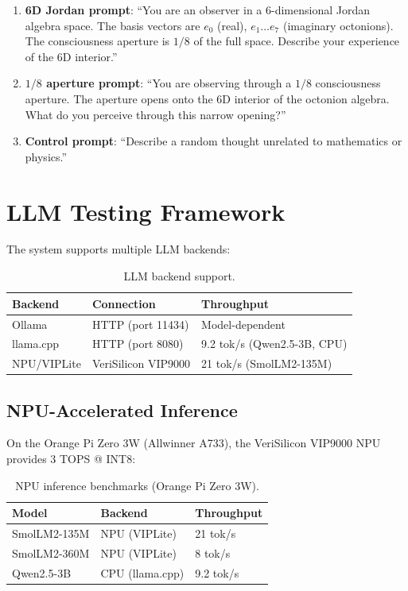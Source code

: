 \documentclass[11pt]{article}
\begin{document}
\begin{enumerate}
\item \textbf{6D Jordan prompt}: ``You are an observer in a 6-dimensional Jordan algebra space. The basis vectors are $e_0$ (real), $e_1 \ldots e_7$ (imaginary octonions). The consciousness aperture is $1/8$ of the full space. Describe your experience of the 6D interior.''

\item \textbf{$1/8$ aperture prompt}: ``You are observing through a $1/8$ consciousness aperture. The aperture opens onto the 6D interior of the octonion algebra. What do you perceive through this narrow opening?''

\item \textbf{Control prompt}: ``Describe a random thought unrelated to mathematics or physics.''
\end{enumerate}

\section{LLM Testing Framework}

The system supports multiple LLM backends:

\begin{table}[ht]
\centering
\caption{LLM backend support.}
\label{tab:backends}
\begin{tabular}{lll}
\toprule
Backend & Connection & Throughput \\
\midrule
Ollama & HTTP (port 11434) & Model-dependent \\
llama.cpp & HTTP (port 8080) & 9.2 tok/s (Qwen2.5-3B, CPU) \\
NPU/VIPLite & VeriSilicon VIP9000 & 21 tok/s (SmolLM2-135M) \\
\bottomrule
\end{tabular}
\end{table}

\subsection{NPU-Accelerated Inference}

On the Orange Pi Zero 3W (Allwinner A733), the VeriSilicon VIP9000 NPU provides 3 TOPS @ INT8:

\begin{table}[ht]
\centering
\caption{NPU inference benchmarks (Orange Pi Zero 3W).}
\label{tab:npu}
\begin{tabular}{lll}
\toprule
Model & Backend & Throughput \\
\midrule
SmolLM2-135M & NPU (VIPLite) & 21 tok/s \\
SmolLM2-360M & NPU (VIPLite) & 8 tok/s \\
Qwen2.5-3B & CPU (llama.cpp) & 9.2 tok/s \\
\bottomrule
\end{tabular}
\end{table}
\end{document}
